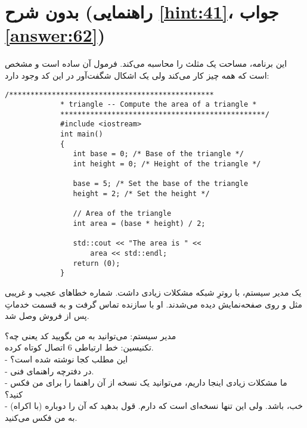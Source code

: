 \section[بدون شرح]{بدون شرح \protect{} (راهنمایی \ref{hint:41}، جواب \ref{answer:62})}
این برنامه، مساحت یک مثلث را محاسبه می‌کند. فرمول آن ساده است و مشخص است که همه چیز کار می‌کند ولی یک اشکال شگفت‌آور در این کد وجود دارد:

\begin{LTR}
        \begin{lstlisting}[style=C++Style]
             /************************************************
             * triangle -- Compute the area of a triangle *
             ************************************************/
             #include <iostream>
             int main()
             {
             	int base = 0; /* Base of the triangle */
             	int height = 0; /* Height of the triangle */

             	base = 5; /* Set the base of the triangle
            	height = 2; /* Set the height */

             	// Area of the triangle
             	int area = (base * height) / 2;

             	std::cout << "The area is " <<
             		area << std::endl;
             	return (0);
             }
        \end{lstlisting}
\end{LTR}

\begin{tcolorbox}
    یک مدیر سیستم، با روترِ شبکه مشکلات زیادی داشت. شماره خطاهای عجیب و غریبی مثل  و  روی صفحه‌نمایش دیده می‌شدند. او با سازنده تماس گرفت و به قسمت خدماتِ پس از فروش وصل شد.

    مدیر سیستم: می‌توانید به من بگویید کد  یعنی چه؟\\
    تکنیسین: خط ارتباطی 6 اتصال کوتاه کرده.\\
    - این مطلب کجا نوشته شده است؟\\
    - در دفترچه راهنمای فنی.\\
    - ما مشکلات زیادی اینجا داریم، می‌توانید یک نسخه از آن راهنما را برای من فکس کنید؟\\
    - (با اکراه) خب، باشد. ولی این تنها نسخه‌ای است که دارم. قول بدهید که آن را دوباره به من فکس می‌کنید.\\
\end{tcolorbox}